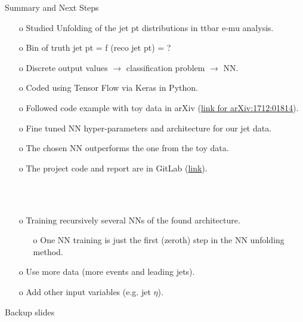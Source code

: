 \begin{frame}{Summary and Next Steps}
\begin{enumerate}
\item[o] Studied Unfolding of the jet pt distributions in ttbar e-mu analysis.
\item[o] Bin of truth jet pt = f (reco jet pt) = ?
\item[o] Discrete output values  $\rightarrow$ classification problem $\rightarrow$ NN.
\item[o] Coded using Tensor Flow via Keras in Python.
\item[o] Followed code example with toy data in arXiv (\href{https://arxiv.org/pdf/1712.01814.pdf}{link for arXiv:1712:01814}).
\item[o] Fine tuned NN hyper-parameters and architecture for our jet data.
\item[o] The chosen NN outperforms the one from the toy data.
\item[o] The project code and report are in GitLab (\href{https://gitlab.cern.ch/lciucu/MLUnfolding/}{link}).
\end{enumerate}
\ \\
\ \\
\begin{enumerate}
\item[o] Training recursively several NNs of the found architecture.
\begin{enumerate}
\item[o] One NN training is just the first (zeroth) step in the NN unfolding method.
\end{enumerate}
\item[o] Use more data (more events and leading jets).
\item[o] Add other input variables (e.g. jet $\eta$).
\end{enumerate}
\end{frame}
\clearpage

\begin{frame}{Backup slides}
\end{frame}
\clearpage

